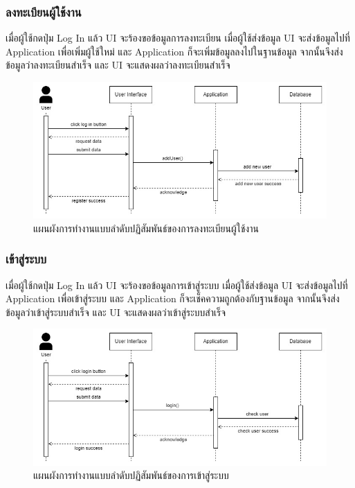 \documentclass[12pt,oneside,openright,a4paper]{cpe-thai-project}
\begin{document}
\subsubsection{ลงทะเบียนผู้ใช้งาน}
\hspace{1cm}
เมื่อผู้ใช้กดปุ่ม Log In แล้ว UI จะร้องขอข้อมูลการลงทะเบียน เมื่อผู้ใช้ส่งข้อมูล UI จะส่งข้อมูลไปที่ Application
เพื่อเพิ่มผู้ใช้ใหม่ และ Application ก็จะเพิ่มข้อมูลลงไปในฐานข้อมูล จากนั้นจึงส่งข้อมูลว่าลงทะเบียนสำเร็จ
และ UI จะแสดงผลว่าลงทะเบียนสำเร็จ
\begin{figure}[!h]\centering
	\includegraphics[width=\textwidth, keepaspectratio=true]{image/chap3/sequence/Register.jpg}
	\caption{แผนผังการทำงานแบบลำดับปฏิสัมพันธ์ของการลงทะเบียนผู้ใช้งาน}\label{fig:S_Register}
\end{figure}

\subsubsection{เข้าสู่ระบบ}
\hspace{1cm}
เมื่อผู้ใช้กดปุ่ม Log In แล้ว UI จะร้องขอข้อมูลการเข้าสู่ระบบ เมื่อผู้ใช้ส่งข้อมูล UI จะส่งข้อมูลไปที่ Application
เพื่อเข้าสู่ระบบ และ Application ก็จะเช็คความถูกต้องกับฐานข้อมูล จากนั้นจึงส่งข้อมูลว่าเข้าสู่ระบบสำเร็จ
และ UI จะแสดงผลว่าเข้าสู่ระบบสำเร็จ
\begin{figure}[!h]\centering
	\includegraphics[width=\textwidth, keepaspectratio=true]{image/chap3/sequence/Login.jpg}
	\caption{แผนผังการทำงานแบบลำดับปฏิสัมพันธ์ของการเข้าสู่ระบบ}\label{fig:S_LogIn}
\end{figure}
\end{document}
